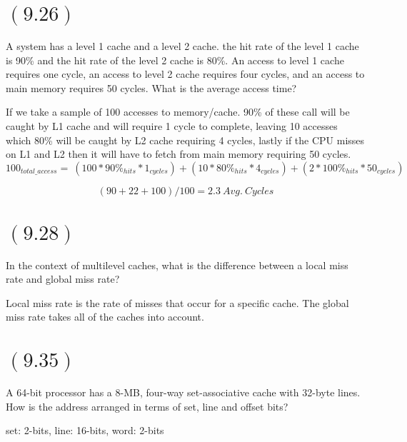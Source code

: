 \documentclass[letterpaper,12pt,titlepage]{article}
\begin{document}
\section*{$(9.26)$} A system has a level 1 cache and a level 2 cache. the hit rate of the level 1 cache is 90\% and the hit rate of the level 2 cache is 80\%. An access to level 1 cache requires one cycle, an access to level 2 cache requires four cycles, and an access to main memory requires 50 cycles. What is the average access time?
\begin{mdframed}[style=MyFrame]
If we take a sample of 100 accesses to memory/cache. 90\% of these call will be caught by L1 cache and will require 1 cycle to complete, leaving 10 accesses which 80\% will be caught by L2 cache requiring 4 cycles, lastly if the CPU misses on L1 and L2 then it will have to fetch from main memory requiring 50 cycles. 
\begin{equation*}
100_{total\_access} = ~(100*90\%_{hits}*1_{cycles})+(10*80\%_{hits}*4_{cycles})+(2*100\%_{hits}*50_{cycles})
\end{equation*}

\begin{equation*}
(90+22+100)/100=2.3 ~Avg.~Cycles
\end{equation*}

\end{mdframed}

\section*{$(9.28)$} In the context of multilevel caches, what is the difference between a local miss rate and global miss rate?

\begin{mdframed}[style=MyFrame]
Local miss rate is the rate of misses that occur for a specific cache. The global miss rate takes all of the caches into account.
\end{mdframed}

\section*{$(9.35)$} A 64-bit processor has a 8-MB, four-way set-associative cache with 32-byte lines. How is the address arranged in terms of set, line and offset bits?

\begin{mdframed}[style=MyFrame]
set: 2-bits, line: 16-bits, word: 2-bits
\end{mdframed}
\end{document}
